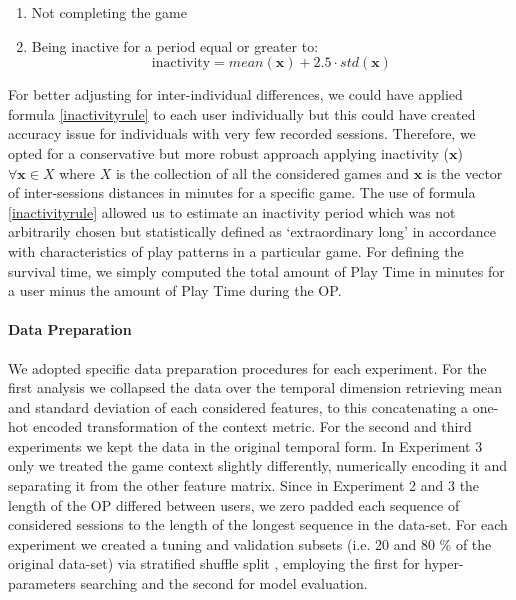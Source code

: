 \begin{enumerate}
    \item Not completing the game
    \item Being inactive for a period equal or greater to:
        \begin{equation}
            \label{inactivityrule}
            \text{inactivity} = 
            mean(\mathbf{x}) + 2.5 \cdot std(\mathbf{x})
        \end{equation}
\end{enumerate}

For better adjusting for inter-individual differences, we could have applied formula \ref{inactivityrule} to each user individually but this could have created accuracy issue for individuals with very few recorded sessions. Therefore, we opted for a conservative but more robust approach applying inactivity ($\mathbf{x}$) $\forall \mathbf{x} \in X$ where $X$ is the collection of all the considered games and $\mathbf{x}$ is the vector of inter-sessions distances in minutes for a specific game. The use of formula \ref{inactivityrule} allowed us to estimate an inactivity period which was not arbitrarily chosen but statistically defined as ‘extraordinary long’ in accordance with characteristics of play patterns in a particular game. For defining the survival time, we simply computed the total amount of Play Time in minutes for a user minus the amount of Play Time during the OP.



\paragraph*{Data Preparation}We adopted specific data preparation procedures for each experiment. For the first analysis we collapsed the data over the temporal dimension retrieving mean and standard deviation of each considered features, to this concatenating a one-hot encoded transformation of the context metric. For the second and third experiments we kept the data in the original temporal form. In Experiment 3 only we treated the game context slightly differently, numerically encoding it and separating it from the other feature matrix. Since in Experiment 2 and 3 the length of the OP differed between users, we zero padded each sequence of considered sessions to the length of the longest sequence in the data-set. For each experiment we created a tuning and validation subsets (i.e. 20 and 80 \% of the original data-set) via stratified shuffle split \cite{scikit-learn}, employing the first for hyper-parameters searching and the second for model evaluation.

